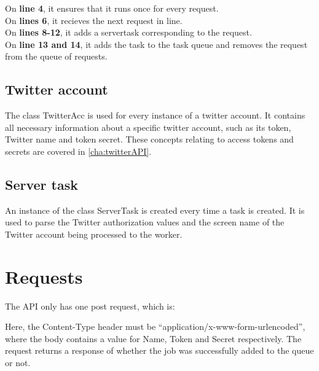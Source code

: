 On \textbf{line 4}, it ensures that it runs once for every request. \\
On \textbf{lines 6}, it recieves the next request in line.\\
On \textbf{lines 8-12}, it adds a servertask corresponding to the request.\\
On \textbf{line 13 and 14}, it adds the task to the task queue and removes the
request from the queue of requests.\\

\subsection{Twitter account}
The class TwitterAcc is used for every instance of a twitter account. It
contains all necessary information about a specific twitter account, such as its
token, Twitter name and token secret. These concepts relating to access tokens
and secrets are covered in \autoref{cha:twitterAPI}.

\subsection{Server task}
An instance of the class ServerTask is created every time a task is created. It
is used to parse the Twitter authorization values and the screen name of the
Twitter account being processed to the worker.


\section{Requests}
The \ac{API} only has one post request, which is: \nl

\nl

Here, the Content-Type header must be ``application/x-www-form-urlencoded'',
where the body contains a value for Name, Token and Secret
respectively.
The request returns a response of whether the job was successfully added to the
queue or not.



